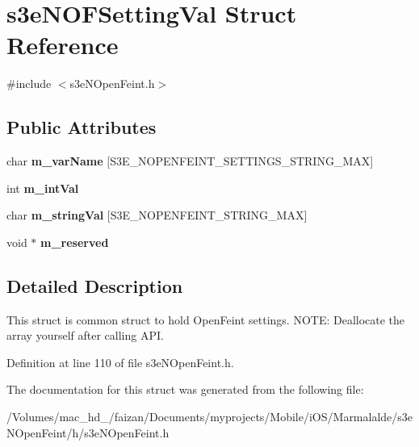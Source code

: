 \hypertarget{structs3e_n_o_f_setting_val}{
\section{s3eNOFSettingVal Struct Reference}
\label{structs3e_n_o_f_setting_val}
}


{\ttfamily \#include $<$s3eNOpenFeint.h$>$}

\subsection*{Public Attributes}
\begin{DoxyCompactItemize}
\item 
\hypertarget{structs3e_n_o_f_setting_val_afd09031ddf2e86b8faa46b8d3574dcda}{
char {\bfseries m\_\-varName} \mbox{[}S3E\_\-NOPENFEINT\_\-SETTINGS\_\-STRING\_\-MAX\mbox{]}}
\label{structs3e_n_o_f_setting_val_afd09031ddf2e86b8faa46b8d3574dcda}

\item 
\hypertarget{group___n_open_feint_api_group_ga8a04c29667152dbeadff79152b7dbb24}{
int {\bfseries m\_\-intVal}}
\label{group___n_open_feint_api_group_ga8a04c29667152dbeadff79152b7dbb24}

\item 
\hypertarget{group___n_open_feint_api_group_ga9ba119d360def536cc5e03bc76d58cdd}{
char {\bfseries m\_\-stringVal} \mbox{[}S3E\_\-NOPENFEINT\_\-STRING\_\-MAX\mbox{]}}
\label{group___n_open_feint_api_group_ga9ba119d360def536cc5e03bc76d58cdd}

\item 
\hypertarget{group___n_open_feint_api_group_ga6aee3bd956a465ec8553735c8a34f3c2}{
void $\ast$ {\bfseries m\_\-reserved}}
\label{group___n_open_feint_api_group_ga6aee3bd956a465ec8553735c8a34f3c2}

\end{DoxyCompactItemize}


\subsection{Detailed Description}
This struct is common struct to hold OpenFeint settings. NOTE: Deallocate the array yourself after calling API. 

Definition at line 110 of file s3eNOpenFeint.h.



The documentation for this struct was generated from the following file:\begin{DoxyCompactItemize}
\item 
/Volumes/mac\_\-hd\_/faizan/Documents/myprojects/Mobile/iOS/Marmalalde/s3eNOpenFeint/h/s3eNOpenFeint.h\end{DoxyCompactItemize}
